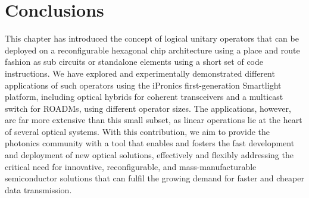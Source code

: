\section{Conclusions}
This chapter has introduced the concept of logical unitary operators that can be deployed on a reconfigurable hexagonal chip architecture using a place and route fashion as sub circuits or standalone elements using a short set of code instructions.
We have explored and experimentally demonstrated different applications of such operators using the iPronics first-generation Smartlight platform, including optical hybrids for coherent transceivers and a multicast switch for ROADMs, using different operator sizes.
The applications, however, are far more extensive than this small subset, as linear operations lie at the heart of several optical systems.
With this contribution, we aim to provide the photonics community with a tool that enables and fosters the fast development and deployment of new optical solutions, effectively and flexibly addressing the critical need for innovative, reconfigurable, and mass-manufacturable semiconductor solutions that can fulfil the growing demand for faster and cheaper data transmission.

